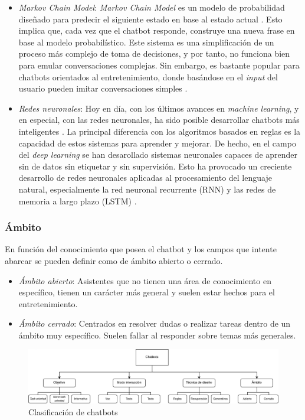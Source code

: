 \begin{itemize}
	\item \textit{Markov Chain Model}: \textit{Markov Chain Model} es un modelo de probabilidad diseñado para predecir el siguiente estado en base al estado actual \cite{designTechniques}. Esto implica que, cada vez que el chatbot responde, construye una nueva frase en base al modelo probabilístico. Este sistema es una simplificación de un proceso más complejo de toma de decisiones, y por tanto, no funciona bien para emular conversaciones complejas. Sin embargo, es bastante popular para chatbots orientados al entretenimiento, donde basándose en el \textit{input} del usuario pueden imitar conversaciones simples \cite{designTechniques}. 
	\item \textit{Redes neuronales}: Hoy en día, con los últimos avances en \textit{machine learning}, y en especial, con las redes neuronales, ha sido posible desarrollar chatbots más inteligentes \cite{designTechniques}. La principal diferencia con los algoritmos basados en reglas es la capacidad de estos sistemas para aprender y mejorar. De hecho, en el campo del \textit{deep learning} se han desarollado sistemas neuronales capaces de aprender sin de datos sin etiquetar y sin supervisión. Esto ha provocado un creciente desarrollo de redes neuronales aplicadas al procesamiento del lenguaje natural, especialmente la red neuronal recurrente (RNN) y las redes de memoria a largo plazo (LSTM) \cite{designTechniques}.
\end{itemize}

\subsubsection{Ámbito}
En función del conocimiento que posea el chatbot y los campos que intente abarcar se pueden definir como de ámbito abierto o cerrado.

\begin{itemize}
	\item \textit{Ámbito  abierto}: Asistentes que no tienen una área de conocimiento en específico, tienen un carácter más general y suelen estar hechos para el entretenimiento.
	\item \textit{Ámbito cerrado}: Centrados en resolver dudas o realizar tareas dentro de un ámbito muy específico. Suelen  fallar al responder sobre temas más generales.
\end{itemize}


\begin{figure}[htbp]
\centering
\includegraphics[scale=0.25]{../images/clasificacionChatbots.png} 
\caption{Clasificación de chatbots}
\label{fig:x clasificacion chatbots}
\end{figure}

